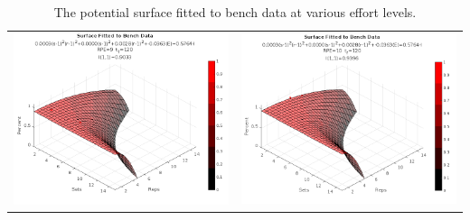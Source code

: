 \begin{table}[h]
\begin{tabular}{c|c}
        \includegraphics[width=80mm]{BenchSurface/9.png} &
        \includegraphics[width=80mm]{BenchSurface/10.png} \\
    \end{tabular}
    \caption{The potential surface fitted to bench data at various effort levels.}
    \label{tab:AppBBenchPotentialSurfaceAcrossEffort}
\end{table}

